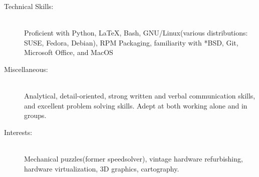 \documentclass[letterpaper, 10pt]{article}
\begin{document}
\begin{description}
    \item[Technical Skills:] 
        \ \\Proficient with Python, \LaTeX, Bash, GNU/Linux(various distributions: SUSE, Fedora, Debian), RPM Packaging, familiarity with *BSD, Git, Microsoft Office, and MacOS
    \item[Miscellaneous:]
        \ \\ Analytical, detail-oriented, strong written and verbal communication skills, and excellent problem solving skills. Adept at both working alone and in groups. 
    \item[Interests:]
        \ \\Mechanical puzzles(former speedsolver), vintage hardware refurbishing, hardware virtualization, 3D graphics, cartography.
\end{description}
\end{document}
